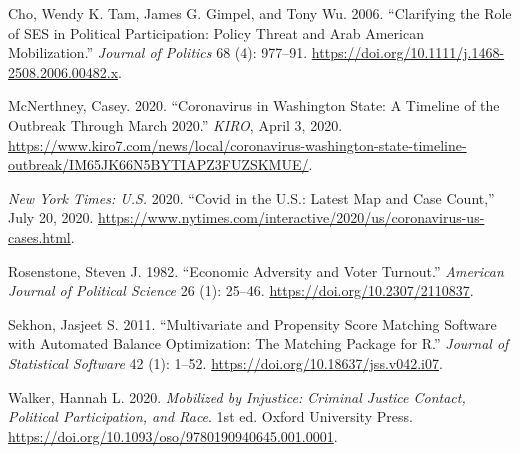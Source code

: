\documentclass[
  12pt,
]{article}
\newlength{\cslhangindent}
\newenvironment{cslreferences}%
  {\setlength{\parindent}{0pt}%
  \everypar{\setlength{\hangindent}{\cslhangindent}}\ignorespaces}%
  {\par}
\begin{document}
\hypertarget{refs}{}
\begin{cslreferences}
\leavevmode\hypertarget{ref-Cho2006a}{}%
Cho, Wendy K. Tam, James G. Gimpel, and Tony Wu. 2006. ``Clarifying the Role of SES in Political Participation: Policy Threat and Arab American Mobilization.'' \emph{Journal of Politics} 68 (4): 977--91. \url{https://doi.org/10.1111/j.1468-2508.2006.00482.x}.

\leavevmode\hypertarget{ref-McNerthney2020}{}%
McNerthney, Casey. 2020. ``Coronavirus in Washington State: A Timeline of the Outbreak Through March 2020.'' \emph{KIRO}, April 3, 2020. \url{https://www.kiro7.com/news/local/coronavirus-washington-state-timeline-outbreak/IM65JK66N5BYTIAPZ3FUZSKMUE/}.

\leavevmode\hypertarget{ref-nyt2020}{}%
\emph{New York Times: U.S.} 2020. ``Covid in the U.S.: Latest Map and Case Count,'' July 20, 2020. \url{https://www.nytimes.com/interactive/2020/us/coronavirus-us-cases.html}.

\leavevmode\hypertarget{ref-Rosenstone1982}{}%
Rosenstone, Steven J. 1982. ``Economic Adversity and Voter Turnout.'' \emph{American Journal of Political Science} 26 (1): 25--46. \url{https://doi.org/10.2307/2110837}.

\leavevmode\hypertarget{ref-Sekhon2011}{}%
Sekhon, Jasjeet S. 2011. ``Multivariate and Propensity Score Matching Software with Automated Balance Optimization: The Matching Package for R.'' \emph{Journal of Statistical Software} 42 (1): 1--52. \url{https://doi.org/10.18637/jss.v042.i07}.

\leavevmode\hypertarget{ref-Walker2020a}{}%
Walker, Hannah L. 2020. \emph{Mobilized by Injustice: Criminal Justice Contact, Political Participation, and Race}. 1st ed. Oxford University Press. \url{https://doi.org/10.1093/oso/9780190940645.001.0001}.
\end{cslreferences}
\end{document}
